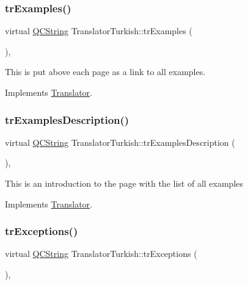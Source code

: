 \subsubsection{\texorpdfstring{trExamples()}{trExamples()}}
{\footnotesize\ttfamily virtual \mbox{\hyperlink{class_q_c_string}{Q\+C\+String}} Translator\+Turkish\+::tr\+Examples (\begin{DoxyParamCaption}{ }\end{DoxyParamCaption})\hspace{0.3cm}{\ttfamily [inline]}, {\ttfamily [virtual]}}

This is put above each page as a link to all examples. 

Implements \mbox{\hyperlink{class_translator}{Translator}}.

\mbox{\label{class_translator_turkish_abc4a8e9592ab2662ed666574b06e2b5b}} 
\subsubsection{\texorpdfstring{trExamplesDescription()}{trExamplesDescription()}}
{\footnotesize\ttfamily virtual \mbox{\hyperlink{class_q_c_string}{Q\+C\+String}} Translator\+Turkish\+::tr\+Examples\+Description (\begin{DoxyParamCaption}{ }\end{DoxyParamCaption})\hspace{0.3cm}{\ttfamily [inline]}, {\ttfamily [virtual]}}

This is an introduction to the page with the list of all examples 

Implements \mbox{\hyperlink{class_translator}{Translator}}.

\mbox{\label{class_translator_turkish_a08f9c9d789df14c377ff8a43db286a9d}} 
\subsubsection{\texorpdfstring{trExceptions()}{trExceptions()}}
{\footnotesize\ttfamily virtual \mbox{\hyperlink{class_q_c_string}{Q\+C\+String}} Translator\+Turkish\+::tr\+Exceptions (\begin{DoxyParamCaption}{ }\end{DoxyParamCaption})\hspace{0.3cm}{\ttfamily [inline]}, {\ttfamily [virtual]}}

